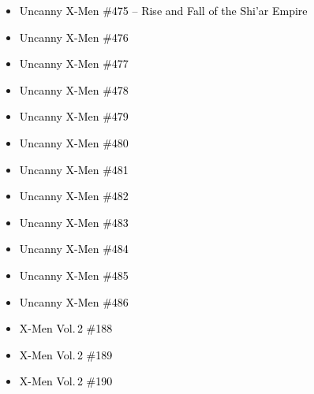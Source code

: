 \documentclass[12pt]{article}
\newcommand{\checkbox}{\raisebox{0.0ex}{\fbox{\rule{0ex}{1.5ex} \rule{1.5ex}{0ex}}}}
\begin{document}
\vspace{0.3cm}
\noindent
\begin{tcolorbox}[
  colback=white!95!gray,
  colframe=black,
  width=\textwidth,
  arc=4mm,
  auto outer arc,
  boxrule=0.8pt,
  left=8pt,right=8pt,top=8pt,bottom=8pt
]
\begin{itemize}[left=0pt,label={\checkbox}]
  \item \textcolor{black}{Uncanny X-Men \#475 – Rise and Fall of the Shi'ar Empire}
  \item \textcolor{black}{Uncanny X-Men \#476}
  \item \textcolor{black}{Uncanny X-Men \#477}
  \item \textcolor{black}{Uncanny X-Men \#478}
  \item \textcolor{black}{Uncanny X-Men \#479}
  \item \textcolor{black}{Uncanny X-Men \#480}
  \item \textcolor{black}{Uncanny X-Men \#481}
  \item \textcolor{black}{Uncanny X-Men \#482}
  \item \textcolor{black}{Uncanny X-Men \#483}
  \item \textcolor{black}{Uncanny X-Men \#484}
  \item \textcolor{black}{Uncanny X-Men \#485}
  \item \textcolor{black}{Uncanny X-Men \#486}
  \item \textcolor{black}{X-Men Vol.\,2 \#188}
  \item \textcolor{black}{X-Men Vol.\,2 \#189}
  \item \textcolor{black}{X-Men Vol.\,2 \#190}
\end{itemize}
\end{tcolorbox}

\newpage
{}
\end{document}
